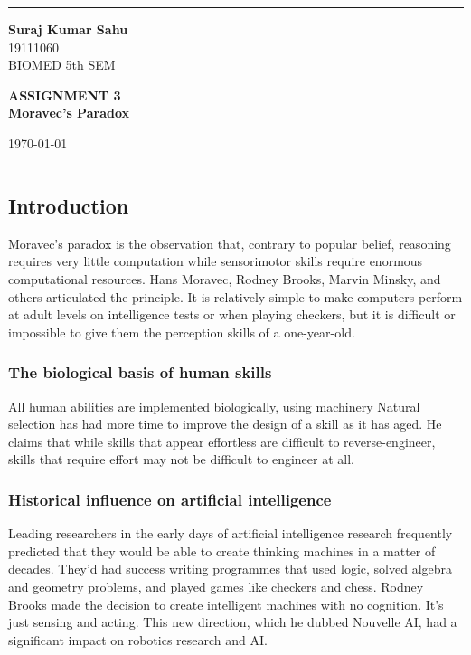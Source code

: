 \documentclass[12pt,a4paper]{article}
\begin{document}
    
    \hrule \medskip %
    \begin{minipage}{0.3\textwidth}
    \raggedright
    \small
    \textbf{Suraj Kumar Sahu}
    \\
    19111060
    \\
    BIOMED 5th SEM
    
    \end{minipage}
    \begin{minipage}{0.45\textwidth} 
    \centering 
    \large 
    \textbf{ASSIGNMENT 3}\\
    \normalsize 
    \textbf{Moravec’s Paradox}\\ 
    \end{minipage}
    \begin{minipage}{0.2\textwidth}
    \raggedleft
    \today\hfill\\
    \end{minipage}
    \medskip\hrule 
    \bigskip

\subsection*{Introduction}
Moravec's paradox is the observation that, contrary to popular belief, reasoning requires very little computation while sensorimotor skills require enormous computational resources. Hans Moravec, Rodney Brooks, Marvin Minsky, and others articulated the principle. It is relatively simple to make computers perform at adult levels on intelligence tests or when playing checkers, but it is difficult or impossible to give them the perception skills of a one-year-old.

\subsubsection*{The biological basis of human skills}
All human abilities are implemented biologically, using machinery Natural selection has had more time to improve the design of a skill as it has aged. He claims that while skills that appear effortless are difficult to reverse-engineer, skills that require effort may not be difficult to engineer at all.

\subsubsection*{Historical influence on artificial intelligence}
Leading researchers in the early days of artificial intelligence research frequently predicted that they would be able to create thinking machines in a matter of decades. They'd had success writing programmes that used logic, solved algebra and geometry problems, and played games like checkers and chess. Rodney Brooks made the decision to create intelligent machines with no cognition. It's just sensing and acting. This new direction, which he dubbed Nouvelle AI, had a significant impact on robotics research and AI.
\end{document}
